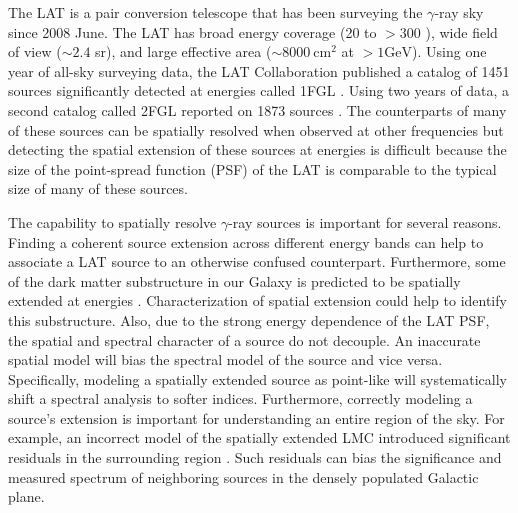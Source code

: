 \documentclass[12pt,preprint]{aastex}
\newcommand{\mev}{\text{MeV}\xspace}
\newcommand{\gev}{\text{GeV}\xspace}
\newcommand{\cm}{\text{cm}\xspace}
\begin{document}
{The LAT is a pair conversion telescope that has been surveying the
$\gamma$-ray sky since 2008 June.  The LAT has broad energy coverage
(20 \mev to $>300$ \gev), wide field of view ($\sim 2.4$ sr), and large
effective area ($\sim 8000\ \cm^2$ at $>1 \gev$).  
Using one year of all-sky surveying data, the LAT Collaboration published
a catalog of 1451 sources significantly detected at \gev energies called 1FGL \citep{first_cat}.
Using two years of data, a second catalog called 2FGL reported on 1873
sources \citep{second_cat}.
The counterparts of many of these sources can be spatially resolved
when observed at other frequencies but detecting the spatial extension
of these sources at \gev energies is difficult because the size of the
point-spread function (PSF) of the LAT is comparable to the typical size
of many of these sources.

The capability to spatially resolve \gev $\gamma$-ray
sources is important for several reasons.  
Finding a coherent source extension across different energy bands can
help to associate a LAT source to an otherwise confused counterpart.
Furthermore, some of the dark matter substructure in our Galaxy 
is predicted to be spatially extended at \gev energies \citep{pre_luanch_dark_matter_fermi}.  
Characterization of spatial extension could help to identify this substructure.
Also,
due to the strong energy dependence of the LAT PSF, the spatial and
spectral character of a source do not decouple. An inaccurate
spatial model will bias the spectral model of the source and vice versa. Specifically,
modeling a spatially extended source as point-like will systematically
shift a spectral analysis to softer indices. Furthermore, correctly
modeling a source's extension is important for 
understanding an entire region of the sky. For example,
an incorrect model of the spatially extended LMC introduced
significant residuals in the surrounding region \citep{first_cat,second_cat}.
Such residuals can bias the significance and measured spectrum of
neighboring sources in the densely populated Galactic plane.


}
\end{document}
